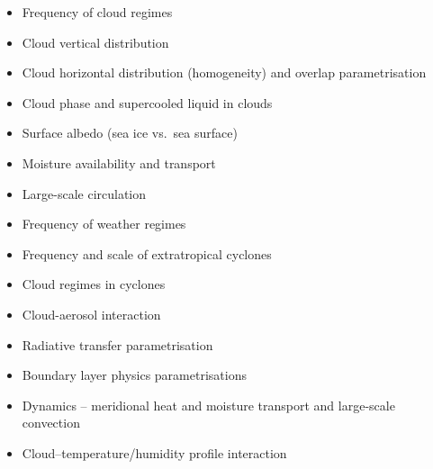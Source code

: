 \begin{itemize}
\itemsep1pt\parskip0pt
\item
  Frequency of cloud regimes
\item
  Cloud vertical distribution
\item
  Cloud horizontal distribution (homogeneity) and overlap
  parametrisation
\item
  Cloud phase and supercooled liquid in clouds
\item
  Surface albedo (sea ice vs.~sea surface)
\item
  Moisture availability and transport
\item
  Large-scale circulation
\item
  Frequency of weather regimes
\item
  Frequency and scale of extratropical cyclones
\item
  Cloud regimes in cyclones
\item
  Cloud-aerosol interaction
\item
  Radiative transfer parametrisation
\item
  Boundary layer physics parametrisations
\item
  Dynamics -- meridional heat and moisture transport and large-scale
  convection
\item
  Cloud--temperature/humidity profile interaction
\end{itemize}

